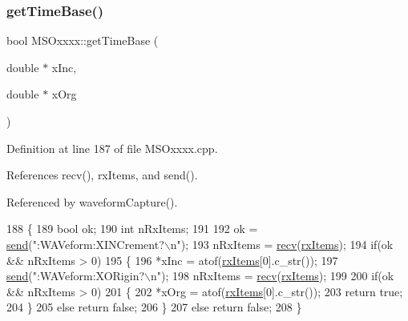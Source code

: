 \subsubsection{\texorpdfstring{get\+Time\+Base()}{getTimeBase()}}
{\footnotesize\ttfamily bool M\+S\+Oxxxx\+::get\+Time\+Base (\begin{DoxyParamCaption}\item[{double $\ast$}]{x\+Inc,  }\item[{double $\ast$}]{x\+Org }\end{DoxyParamCaption})\hspace{0.3cm}{\ttfamily [private]}}



Definition at line 187 of file M\+S\+Oxxxx.\+cpp.



References recv(), rx\+Items, and send().



Referenced by waveform\+Capture().


\begin{DoxyCode}
188 \{
189     \textcolor{keywordtype}{bool} ok;
190     \textcolor{keywordtype}{int} nRxItems;
191 
192     ok = \hyperlink{classMSOxxxx_ae77668a1ae4ccb74e0ed5f2485dfdebf}{send}(\textcolor{stringliteral}{":WAVeform:XINCrement?\(\backslash\)n"});
193     nRxItems = \hyperlink{classMSOxxxx_aa02e46a61e287ef1f5377e9e42399faf}{recv}(\hyperlink{classMSOxxxx_a847cae37181e9ec5f481edcc3fb19b1a}{rxItems});
194     \textcolor{keywordflow}{if}(ok && nRxItems > 0)
195     \{
196         *xInc = atof(\hyperlink{classMSOxxxx_a847cae37181e9ec5f481edcc3fb19b1a}{rxItems}[0].c\_str());
197         \hyperlink{classMSOxxxx_ae77668a1ae4ccb74e0ed5f2485dfdebf}{send}(\textcolor{stringliteral}{":WAVeform:XORigin?\(\backslash\)n"});       
198         nRxItems = \hyperlink{classMSOxxxx_aa02e46a61e287ef1f5377e9e42399faf}{recv}(\hyperlink{classMSOxxxx_a847cae37181e9ec5f481edcc3fb19b1a}{rxItems});
199 
200         \textcolor{keywordflow}{if}(ok && nRxItems > 0)
201         \{
202             *xOrg = atof(\hyperlink{classMSOxxxx_a847cae37181e9ec5f481edcc3fb19b1a}{rxItems}[0].c\_str());
203             \textcolor{keywordflow}{return} \textcolor{keyword}{true};
204         \}
205         \textcolor{keywordflow}{else} \textcolor{keywordflow}{return} \textcolor{keyword}{false};
206     \}
207     \textcolor{keywordflow}{else} \textcolor{keywordflow}{return} \textcolor{keyword}{false};
208 \}
\end{DoxyCode}
\mbox{\label{classHierarchy_a255174fe4d316d2a3f430dcb9dab29f1}} 
